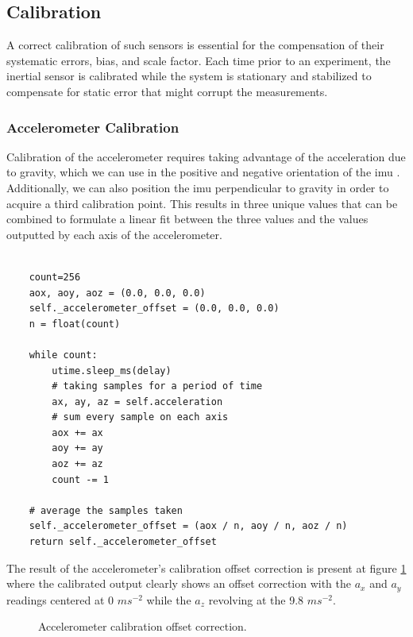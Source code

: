 \subsection{Calibration}

A correct calibration of such sensors is essential for the compensation of their systematic errors, bias, and scale factor. Each time prior to an experiment, the inertial sensor is calibrated while the system is stationary and stabilized to compensate for static error that might corrupt the measurements.

\subsubsection{Accelerometer Calibration}

Calibration of the accelerometer requires taking advantage of the acceleration due to gravity, which we can use in the positive and negative orientation of the \acrshort{imu} \cite{won2009triaxial}. Additionally, we can also position the \acrshort{imu} perpendicular to gravity in order to acquire a third calibration point. This results in three unique values that can be combined to formulate a linear fit between the three values and the values outputted by each axis of the accelerometer.

\lstset{language=Python}
\begin{lstlisting}[frame=single]  % Start your code-block

    count=256
    aox, aoy, aoz = (0.0, 0.0, 0.0)
    self._accelerometer_offset = (0.0, 0.0, 0.0)
    n = float(count)

    while count:
        utime.sleep_ms(delay)
        # taking samples for a period of time
        ax, ay, az = self.acceleration
        # sum every sample on each axis
        aox += ax
        aoy += ay
        aoz += az 
        count -= 1

    # average the samples taken
    self._accelerometer_offset = (aox / n, aoy / n, aoz / n)
    return self._accelerometer_offset
\end{lstlisting}

The result of the accelerometer's calibration offset correction is present at figure \ref{fig:accelerometer_calibration} where the calibrated output clearly shows an offset correction with the $a_x$ and $a_y$ readings centered at 0 $ms^{-2}$ while the $a_z$ revolving at the 9.8 $ms^{-2}$.

\begin{figure}[!h]
    \centering
    \resizebox{0.8\linewidth}{!}{}
    \caption{Accelerometer calibration offset correction.}
    \label{fig:accelerometer_calibration}
\end{figure}

